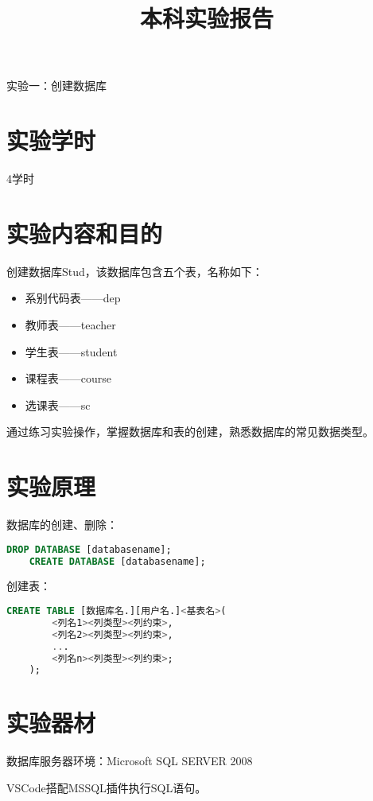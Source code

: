 \documentclass[a4paper]{uestcreport}
\title{本科实验报告}
\date{\zhtoday}
\begin{document}
\makecover

\begin{center}
    \Large
    实验一：创建数据库
\end{center}
\thispagestyle{fancy}
\section{实验学时}
4学时

\section{实验内容和目的}
创建数据库Stud，该数据库包含五个表，名称如下：
\begin{itemize}
    \item 系别代码表——dep
    \item 教师表——teacher
    \item 学生表——student
    \item 课程表——course
    \item 选课表——sc
\end{itemize}

通过练习实验操作，掌握数据库和表的创建，熟悉数据库的常见数据类型。

\section{实验原理}
数据库的创建、删除：
\begin{lstlisting}[language=SQL]
    DROP DATABASE [databasename];
    CREATE DATABASE [databasename];
\end{lstlisting}

创建表：
\begin{lstlisting}[language=SQL]
    CREATE TABLE [数据库名.][用户名.]<基表名>(
        <列名1><列类型><列约束>,
        <列名2><列类型><列约束>,
        ...
        <列名n><列类型><列约束>;
    );
\end{lstlisting}

\section{实验器材}
数据库服务器环境：Microsoft SQL SERVER 2008

VSCode搭配MSSQL插件执行SQL语句。
\end{document}
